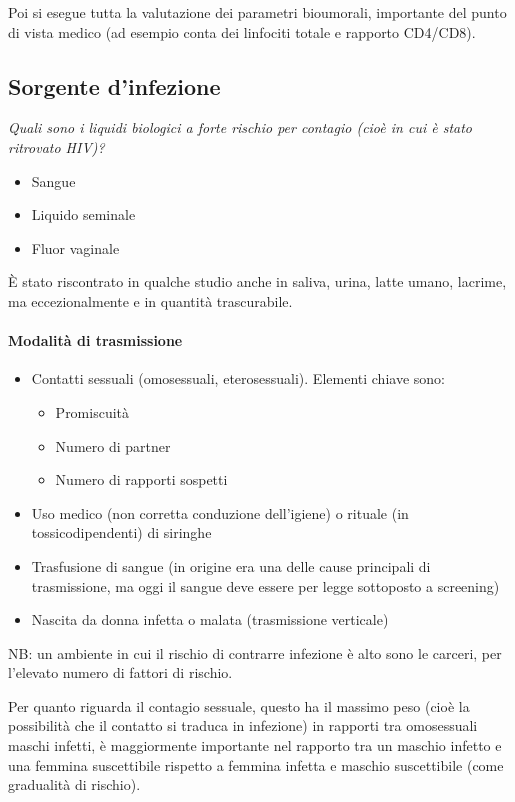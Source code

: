Poi si esegue tutta la valutazione dei parametri bioumorali, importante
del punto di vista medico (ad esempio conta dei linfociti totale e
rapporto CD4/CD8).

\subsection{Sorgente d'infezione}

\emph{Quali sono i liquidi biologici a forte rischio per contagio (cioè
in cui è stato ritrovato HIV)?}

\begin{itemize}
\item
  Sangue
\item
  Liquido seminale
\item
  Fluor vaginale
\end{itemize}

È stato riscontrato in qualche studio anche in saliva, urina, latte
umano, lacrime, ma eccezionalmente e in quantità trascurabile.

\paragraph{Modalità di trasmissione}

\begin{itemize}
\item
  Contatti sessuali (omosessuali, eterosessuali). Elementi chiave sono:

  \begin{itemize}
  \item
    Promiscuità
  \item
    Numero di partner
  \item
    Numero di rapporti sospetti
  \end{itemize}
\item
  Uso medico (non corretta conduzione dell'igiene) o rituale (in
  tossicodipendenti) di siringhe
\item
  Trasfusione di sangue (in origine era una delle cause principali di
  trasmissione, ma oggi il sangue deve essere per legge sottoposto a
  screening)
\item
  Nascita da donna infetta o malata (trasmissione verticale)
\end{itemize}

NB: un ambiente in cui il rischio di contrarre infezione è alto sono le
carceri, per l'elevato numero di fattori di rischio.

Per quanto riguarda il contagio sessuale, questo ha il massimo peso
(cioè la possibilità che il contatto si traduca in infezione) in
rapporti tra omosessuali maschi infetti, è maggiormente importante nel
rapporto tra un maschio infetto e una femmina suscettibile rispetto a
femmina infetta e maschio suscettibile (come gradualità di rischio).

